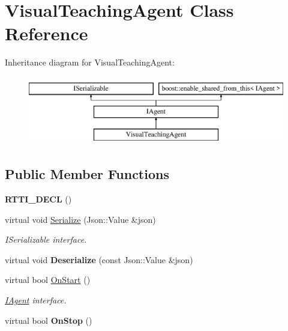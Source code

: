 \hypertarget{class_visual_teaching_agent}{}\section{Visual\+Teaching\+Agent Class Reference}
\label{class_visual_teaching_agent}
Inheritance diagram for Visual\+Teaching\+Agent\+:\begin{figure}[H]
\begin{center}
\leavevmode
\includegraphics[height=3.000000cm]{class_visual_teaching_agent}
\end{center}
\end{figure}
\subsection*{Public Member Functions}
\begin{DoxyCompactItemize}
\item 
\mbox{\label{class_visual_teaching_agent_a07a55abf3b57e23e95a54bc2a7b28b7f}} 
{\bfseries R\+T\+T\+I\+\_\+\+D\+E\+CL} ()
\item 
\mbox{\label{class_visual_teaching_agent_a7de5643a003aa0ecd370bd76f210ea33}} 
virtual void \hyperlink{class_visual_teaching_agent_a7de5643a003aa0ecd370bd76f210ea33}{Serialize} (Json\+::\+Value \&json)
\begin{DoxyCompactList}\small\item\em I\+Serializable interface. \end{DoxyCompactList}\item 
\mbox{\label{class_visual_teaching_agent_acefccd20d7f981f326faf355a0793ea7}} 
virtual void {\bfseries Deserialize} (const Json\+::\+Value \&json)
\item 
\mbox{\label{class_visual_teaching_agent_a6b21e75fb0c63cfe0b46ed7bf6f1578d}} 
virtual bool \hyperlink{class_visual_teaching_agent_a6b21e75fb0c63cfe0b46ed7bf6f1578d}{On\+Start} ()
\begin{DoxyCompactList}\small\item\em \hyperlink{class_i_agent}{I\+Agent} interface. \end{DoxyCompactList}\item 
\mbox{\label{class_visual_teaching_agent_a61484c8115eb3932cda71322b46f80cf}} 
virtual bool {\bfseries On\+Stop} ()
\end{DoxyCompactItemize}
